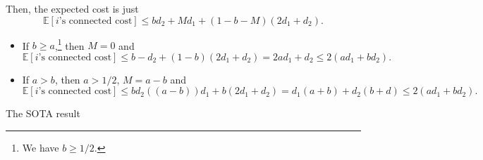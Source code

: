 Then, the expected cost is just
\[
	\mathbb{E}\left[\text{\(i\)'s connected cost}\right] \leq b d_2 + Md_1 + (1 - b - M) (2d_1 + d_2).
\]

\begin{itemize}
	\item If \(b \geq a\),\footnote{We have \(b \geq 1 / 2\).} then \(M = 0\) and
	      \[
		      \mathbb{E}\left[\text{\(i\)'s connected cost}\right] \leq b - d_2 + (1 - b)	(2 d_1 + d_2) = 2ad_1 + d_2 \leq 2(ad_1 + bd_2).
	      \]
	\item If \(a > b\), then \(a > 1 / 2\), \(M = a - b\) and
	      \[
		      \mathbb{E}\left[\text{\(i\)'s connected cost}\right] \leq bd_2 ( (a - b))d_1 + b(2d_1 + d_2) = d_1(a+b)+d_2(b+d) \leq 2(ad_1 + bd_2).
	      \]
\end{itemize}

\begin{remark}[SOTA]
	The SOTA result
\end{remark}